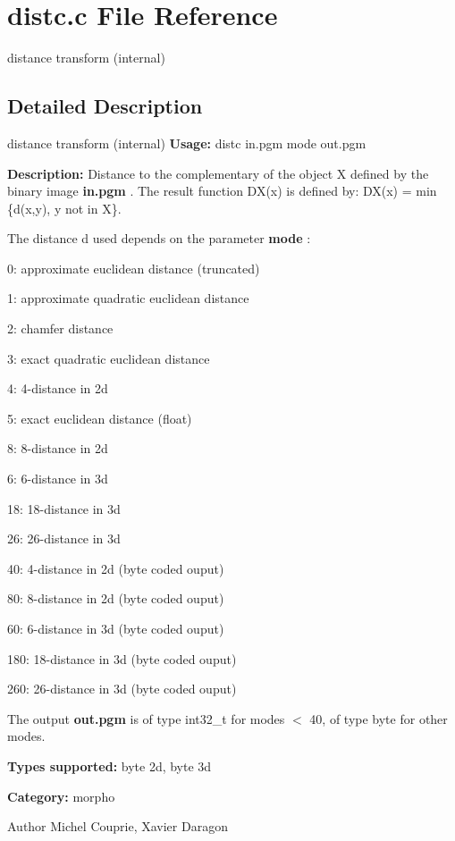 \section{distc.c File Reference}
\label{distc_8c}


distance transform (internal)  




\subsection{Detailed Description}
distance transform (internal) {\bfseries Usage:} distc in.pgm mode out.pgm

{\bfseries Description:} Distance to the complementary of the object X defined by the binary image {\bfseries in.pgm} . The result function DX(x) is defined by: DX(x) = min \{d(x,y), y not in X\}.

The distance d used depends on the parameter {\bfseries mode} : \begin{DoxyItemize}
\item 0: approximate euclidean distance (truncated) \item 1: approximate quadratic euclidean distance \item 2: chamfer distance \item 3: exact quadratic euclidean distance \item 4: 4-\/distance in 2d \item 5: exact euclidean distance (float) \item 8: 8-\/distance in 2d \item 6: 6-\/distance in 3d \item 18: 18-\/distance in 3d \item 26: 26-\/distance in 3d \item 40: 4-\/distance in 2d (byte coded ouput) \item 80: 8-\/distance in 2d (byte coded ouput) \item 60: 6-\/distance in 3d (byte coded ouput) \item 180: 18-\/distance in 3d (byte coded ouput) \item 260: 26-\/distance in 3d (byte coded ouput)\end{DoxyItemize}
The output {\bfseries out.pgm} is of type int32\_\-t for modes $<$ 40, of type byte for other modes.

{\bfseries Types supported:} byte 2d, byte 3d

{\bfseries Category:} morpho

\begin{DoxyAuthor}{Author}
Michel Couprie, Xavier Daragon 
\end{DoxyAuthor}
